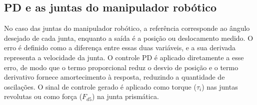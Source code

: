 \subsection{PD e as juntas do manipulador robótico}
No caso das juntas do manipulador robótico, a referência corresponde ao ângulo desejado de cada junta, enquanto a saída é a posição ou deslocamento medido.
O erro é definido como a diferença entre essas duas variáveis, e a sua derivada representa a velocidade da junta.
O controle PD é aplicado diretamente a esse erro, de modo que o termo proporcional reduz o desvio de posição e o termo derivativo fornece amortecimento à resposta, reduzindo a quantidade de oscilações.
O sinal de controle gerado é aplicado como torque ($\tau_i$) nas juntas revolutas ou como força ($F_{d5}$) na junta prismática.

